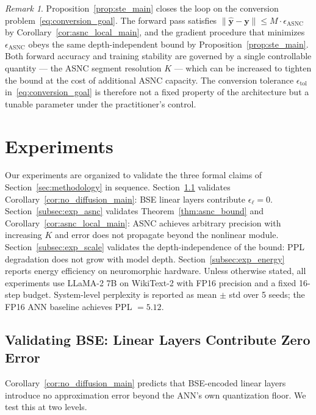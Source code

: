 \documentclass{article}
\theoremstyle{plain}
\theoremstyle{definition}
\theoremstyle{remark}
\newtheorem{remark}[theorem]{Remark}
\begin{document}
\begin{remark}
Proposition~\ref{prop:ste_main} closes the loop on the conversion
problem~\eqref{eq:conversion_goal}. The forward pass satisfies
$\|\hat{\mathbf{y}} - \mathbf{y}\| \le M \cdot \epsilon_{\mathrm{ASNC}}$ by
Corollary~\ref{cor:asnc_local_main}, and the gradient procedure that minimizes
$\epsilon_{\mathrm{ASNC}}$ obeys the same depth-independent bound by
Proposition~\ref{prop:ste_main}. Both forward accuracy and training stability are
governed by a single controllable quantity — the ASNC segment resolution $K$ — which
can be increased to tighten the bound at the cost of additional ASNC capacity. The
conversion tolerance $\epsilon_{\mathrm{tol}}$ in~\eqref{eq:conversion_goal} is
therefore not a fixed property of the architecture but a tunable parameter under the
practitioner's control.
\end{remark}

\section{Experiments}
\label{sec:experiments}

Our experiments are organized to validate the three formal claims of
Section~\ref{sec:methodology} in sequence. Section~\ref{subsec:exp_bse} validates
Corollary~\ref{cor:no_diffusion_main}: BSE linear layers contribute $\epsilon_\ell =
0$. Section~\ref{subsec:exp_asnc} validates Theorem~\ref{thm:asnc_bound} and
Corollary~\ref{cor:asnc_local_main}: ASNC achieves arbitrary precision with increasing
$K$ and error does not propagate beyond the nonlinear module.
Section~\ref{subsec:exp_scale} validates the depth-independence of the bound: PPL
degradation does not grow with model depth. Section~\ref{subsec:exp_energy} reports
energy efficiency on neuromorphic hardware.
%
Unless otherwise stated, all experiments use LLaMA-2 7B on WikiText-2 with FP16
precision and a fixed 16-step budget. System-level perplexity is reported as mean
$\pm$ std over 5 seeds; the FP16 ANN baseline achieves PPL $= 5.12$.


\subsection{Validating BSE: Linear Layers Contribute Zero Error}
\label{subsec:exp_bse}

Corollary~\ref{cor:no_diffusion_main} predicts that BSE-encoded linear layers
introduce no approximation error beyond the ANN's own quantization floor. We test
this at two levels.
\end{document}
